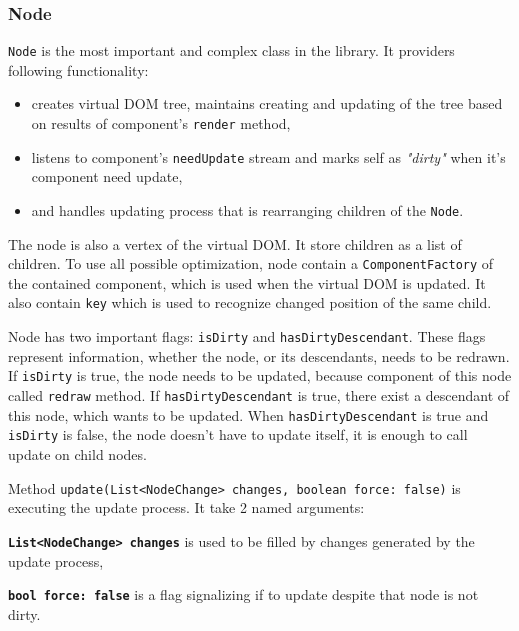     \subsubsection{Node}\label{subsubsec:our-architecture-core-node}
      \texttt{Node} is the most important and complex class in the library.
      It providers following functionality:
      \begin{itemize}
        \item creates virtual DOM tree, maintains creating and updating of the tree based on results of component's \texttt{render} method, 
        \item listens to component's \texttt{needUpdate} stream and marks self as \textit{"dirty"} when it's component need update,
        \item and handles updating process that is rearranging children of the \texttt{Node}.
      \end{itemize}

      The node is also a vertex of the virtual DOM. 
      It store children as a list of children. 
      To use all possible optimization, node contain a \texttt{ComponentFactory} of the contained component, which is used when the virtual DOM is updated.
      It also contain \texttt{key} which is used to recognize changed position of the same child.

      Node has two important flags: \texttt{isDirty} and \texttt{hasDirtyDescendant}. 
      These flags represent information, whether the node, or its descendants, needs to be redrawn.
      If \texttt{isDirty} is true, the node needs to be updated, 
      because component of this node called \texttt{redraw} method.
      If \texttt{hasDirtyDescendant} is true,  
      there exist a descendant of this node, which wants to be updated.
      When \texttt{hasDirtyDescendant} is true and \texttt{isDirty} is false, 
      the node doesn't have to update itself, it is enough to call update on child nodes.

      Method \texttt{update({List<NodeChange> changes, boolean force: false})} is executing the update process. 
      It take 2 named arguments:
      \begin{description}
        \item{\textbf{\texttt{List<NodeChange> changes}}} is used to be filled by changes generated by the update process,
        \item{\textbf{\texttt{bool force: false}}} is a flag signalizing if to update despite that node is not dirty.
      \end{description}

